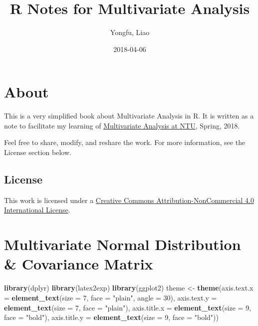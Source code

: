 \documentclass[]{book}
\title{R Notes for Multivariate Analysis}
\author{Yongfu, Liao}
\date{2018-04-06}
\newenvironment{Shaded}{\begin{snugshade}}{\end{snugshade}}
\newcommand{\KeywordTok}[1]{\textcolor[rgb]{0.13,0.29,0.53}{\textbf{#1}}}
\newcommand{\DataTypeTok}[1]{\textcolor[rgb]{0.13,0.29,0.53}{#1}}
\newcommand{\DecValTok}[1]{\textcolor[rgb]{0.00,0.00,0.81}{#1}}
\newcommand{\StringTok}[1]{\textcolor[rgb]{0.31,0.60,0.02}{#1}}
\newcommand{\NormalTok}[1]{#1}
\theoremstyle{definition}
\theoremstyle{definition}
\theoremstyle{definition}
\theoremstyle{remark}
\begin{document}
\maketitle

{
\hypersetup{linkcolor=black}
\setcounter{tocdepth}{1}
\tableofcontents
}
\chapter*{About}\label{about}

This is a very simplified book about Multivariate Analysis in R. It is
written as a note to facilitate my learning of
\href{https://nol2.aca.ntu.edu.tw/nol/coursesearch/print_table.php?course_id=741\%20U3520\&class=\&dpt_code=7410\&ser_no=31954\&semester=106-2\&lang=CH}{Multivariate
Analysis at NTU}, Spring, 2018.

Feel free to share, modify, and reshare the work. For more information,
see the License section below.

\section*{License}\label{license}

This work is licensed under a
\href{https://creativecommons.org/licenses/by-nc/4.0/}{Creative Commons
Attribution-NonCommercial 4.0 International License}.

\chapter{Multivariate Normal Distribution \& Covariance
Matrix}\label{mvnorm}

\begin{Shaded}
\begin{Highlighting}[]
\KeywordTok{library}\NormalTok{(dplyr)}
\KeywordTok{library}\NormalTok{(latex2exp)}
\KeywordTok{library}\NormalTok{(ggplot2)}
\NormalTok{theme <-}\StringTok{ }\KeywordTok{theme}\NormalTok{(}\DataTypeTok{axis.text.x =} \KeywordTok{element_text}\NormalTok{(}\DataTypeTok{size =} \DecValTok{7}\NormalTok{, }\DataTypeTok{face =} \StringTok{"plain"}\NormalTok{, }\DataTypeTok{angle =} \DecValTok{30}\NormalTok{),}
               \DataTypeTok{axis.text.y =} \KeywordTok{element_text}\NormalTok{(}\DataTypeTok{size =} \DecValTok{7}\NormalTok{, }\DataTypeTok{face =} \StringTok{"plain"}\NormalTok{),}
               \DataTypeTok{axis.title.x =} \KeywordTok{element_text}\NormalTok{(}\DataTypeTok{size =} \DecValTok{9}\NormalTok{, }\DataTypeTok{face =} \StringTok{"bold"}\NormalTok{),}
    \DataTypeTok{axis.title.y =} \KeywordTok{element_text}\NormalTok{(}\DataTypeTok{size =} \DecValTok{9}\NormalTok{, }\DataTypeTok{face =} \StringTok{"bold"}\NormalTok{))}
\end{Highlighting}
\end{Shaded}
\end{document}
